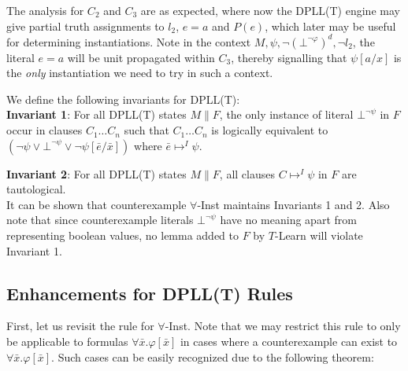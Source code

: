\documentclass{llncs}
\begin{document}


The analysis for $C_2$ and $C_3$ are as expected, where now the DPLL(T) engine may give partial truth assignments to $l_2$, $e = a$ and $P( e )$, which later may be useful for determining instantiations.
Note in the context $M, \psi, \neg( \bot^{\neg \varphi} )^d, \neg l_2$, the literal $e = a$ will be unit propagated within $C_3$, thereby signalling that $\psi[a/x]$ is the \emph{only} instantiation we need to try in such a context.

We define the following invariants for DPLL(T): \\

{\bf Invariant 1}:
For all DPLL(T) states $M \parallel F$, the only instance of literal $\bot^{\neg \psi}$ in $F$ occur in clauses $C_1 \ldots C_n$ such that $C_1 \ldots C_n$ is logically equivalent to $( \neg \psi \vee \bot^{\neg \psi} \vee \neg \psi[\bar{e}/\bar{x}] )$ where $\bar{e} \mapsto^I \psi$.

{\bf Invariant 2}:
For all DPLL(T) states $M \parallel F$, all clauses $C \mapsto^I \psi$ in $F$ are tautological. \\

It can be shown that counterexample $\forall$-Inst maintains Invariants 1 and 2.
Also note that since counterexample literals $\bot^{ \neg \psi }$ have no meaning apart from representing boolean values, no lemma added to $F$ by $T$-Learn will violate Invariant 1.

\subsection{Enhancements for DPLL(T) Rules}

First, let us revisit the rule for $\forall$-Inst.
Note that we may restrict this rule to only be applicable to formulas $\forall \bar{x}. \varphi[ \bar{ x } ]$ in cases where a counterexample can exist to $\forall \bar{x}. \varphi[ \bar{ x } ]$.
Such cases can be easily recognized due to the following theorem:
\end{document}
